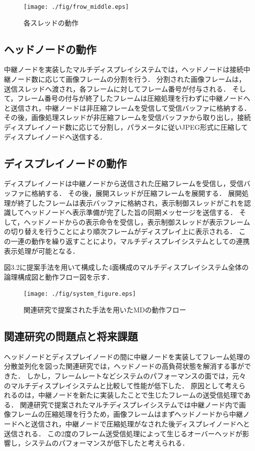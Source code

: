 \begin{figure}[H]
  \hspace*{\fill}
  \texttt{[image: ./fig/frow\_middle.eps]}
  \hspace*{\fill}
  \caption{各スレッドの動作}
\end{figure}

\subsection*{ヘッドノードの動作}
中継ノードを実装したマルチディスプレイシステムでは，ヘッドノードは接続中継ノード数に応じて画像フレームの分割を行う．
分割された画像フレームは，送信スレッドへ渡され，各フレームに対してフレーム番号が付与される．
そして，フレーム番号の付与が終了したフレームは圧縮処理を行わずに中継ノードへと送信され，中継ノードは非圧縮フレームを受信して受信バッファに格納する．
その後，画像処理スレッドが非圧縮フレームを受信バッファから取り出し，接続ディスプレイノード数に応じて分割し，パラメータに従いJPEG形式に圧縮してディスプレイノードへ送信する．

\subsection*{ディスプレイノードの動作}
ディスプレイノードは中継ノードから送信された圧縮フレームを受信し，受信バッファに格納する．
その後，展開スレッドが圧縮フレームを展開する．
展開処理が終了したフレームは表示バッファに格納され，表示制御スレッドがこれを認識してヘッドノードへ表示準備が完了した旨の同期メッセージを送信する．
そして，ヘッドノードからの表示命令を受信し，表示制御スレッドが表示フレームの切り替えを行うことにより順次フレームがディスプレイ上に表示される．
この一連の動作を繰り返すことにより，マルチディスプレイシステムとしての連携表示処理が可能となる．

図3.2に提案手法を用いて構成した4面構成のマルチディスプレイシステム全体の論理構成図と動作フロー図を示す．


\begin{figure}[H]
  \hspace*{\fill}
  \texttt{[image: ./fig/system\_figure.eps]}
  \hspace*{\fill}
  \caption{関連研究で提案された手法を用いたMDの動作フロー}
 \end{figure}

 \subsection*{関連研究の問題点と将来課題}
 ヘッドノードとディスプレイノードの間に中継ノードを実装してフレーム処理の分散並列化を図った関連研究では，ヘッドノードの高負荷状態を解消する事ができた．
 しかし，フレームレートなどシステムのパフォーマンスの面では，元々のマルチディスプレイシステムと比較して性能が低下した．
 原因として考えられるのは，中継ノードを新たに実装したことで生じたフレームの送受信処理である．
 関連研究で提案されたマルチディスプレイシステムでは中継ノード内で画像フレームの圧縮処理を行うため，画像フレームはまずヘッドノードから中継ノードへと送信され，中継ノードで圧縮処理がなされた後ディスプレイノードへと送信される．
 この2度のフレーム送受信処理によって生じるオーバーヘッドが影響し，システムのパフォーマンスが低下したと考えられる．

